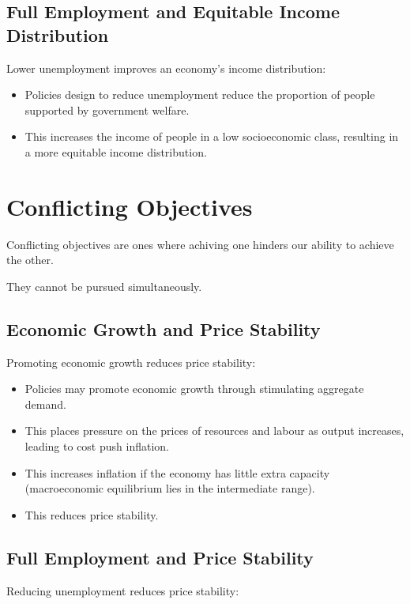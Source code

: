 \documentclass[a4paper,11pt]{article}
\begin{document}
\subsection{Full Employment and Equitable Income Distribution}

Lower unemployment improves an economy's income distribution:

\begin{itemize}
\item Policies design to reduce unemployment reduce the proportion of people
	supported by government welfare.
\item This increases the income of people in a low socioeconomic class,
	resulting in a more equitable income distribution.
\end{itemize}




\section{Conflicting Objectives}

Conflicting objectives are ones where achiving one hinders our ability to
achieve the other.

They cannot be pursued simultaneously.


\subsection{Economic Growth and Price Stability}

Promoting economic growth reduces price stability:

\begin{itemize}
\item Policies may promote economic growth through stimulating aggregate demand.
\item This places pressure on the prices of resources and labour as output
	increases, leading to cost push inflation.
\item This increases inflation if the economy has little extra capacity
	(macroeconomic equilibrium lies in the intermediate range).
\item This reduces price stability.
\end{itemize}


\subsection{Full Employment and Price Stability}

Reducing unemployment reduces price stability:
\end{document}
